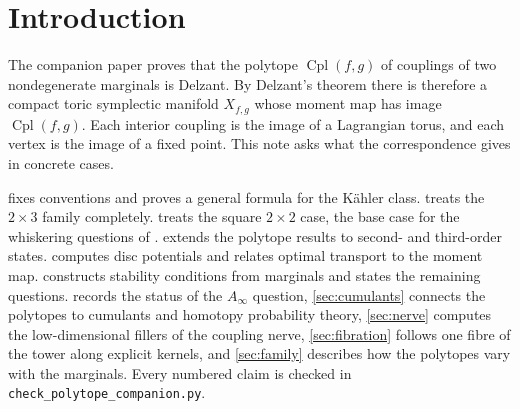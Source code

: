 \documentclass[11pt]{article}
\theoremstyle{definition}
\theoremstyle{remark}
\newcommand{\Cpl}{\operatorname{Cpl}}
\begin{document}
\begin{abstract}
\begin{itemize}[leftmargin=*]
  lifted. Their secondary obstruction is twice the contextual fraction, and their distance to the fillable horns is twice the
  best approximate filler distance. The Fisher bound on the obstructions is attained in the worked tower example.
\item \emph{Synthetic data.} A classifier's confusion table is a coupling. The tables cover: chamber identification
  from samples against its Hoeffding bound; independence tests, whose two degrees of freedom are the dimension of the
  hexagon; two models scored on one label set, whose correlated errors the gluing filler misses by a factor of six; and
  horn data from separate studies, where sampling noise and contextuality separate.
\end{itemize}
\end{abstract}

\tableofcontents

\section{Introduction}\label{sec:intro}

The companion paper \cite{Conditionals} proves that the polytope $\Cpl(f,g)$ of couplings of two
nondegenerate marginals is Delzant. By Delzant's theorem \cite{Delzant1988} there is therefore a
compact toric symplectic manifold $X_{f,g}$ whose moment map has image $\Cpl(f,g)$. Each interior
coupling is the image of a Lagrangian torus, and each vertex is the image of a fixed point. This note
asks what the correspondence gives in concrete cases.

 fixes conventions and proves a general formula for the Kähler class.
 treats the $2\times3$ family completely.  treats the square $2\times2$
case, the base case for the whiskering questions of \cite[\S\S5, 9]{Conditionals}. 
extends the polytope results to second- and third-order states.  computes disc
potentials and relates optimal transport to the moment map.  constructs stability
conditions from marginals and states the remaining questions.  records the status of
the $A_\infty$ question, \cref{sec:cumulants} connects the polytopes to cumulants and homotopy probability
theory, \cref{sec:nerve} computes the low-dimensional fillers of the coupling nerve, \cref{sec:fibration} follows one
fibre of the tower along explicit kernels, and \cref{sec:family} describes how the polytopes vary with the
marginals. Every numbered claim is checked in \texttt{check\_polytope\_companion.py}.
\end{document}
